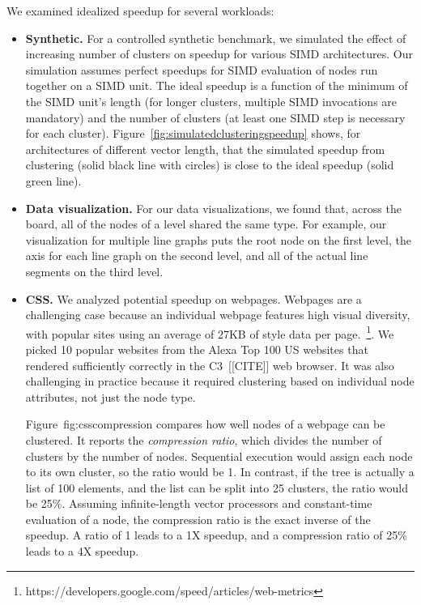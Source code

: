 We examined idealized speedup for several workloads:

\begin{itemize}

\item \textbf{Synthetic.} For a controlled synthetic benchmark, we simulated the effect of increasing number of clusters on speedup for various SIMD architectures.  Our simulation assumes perfect speedups for SIMD evaluation of nodes run together on a SIMD unit. The ideal speedup is a function of the minimum of the SIMD unit's length (for longer clusters, multiple SIMD invocations are mandatory) and the number of clusters (at least one SIMD step is necessary for each cluster).   Figure~\ref{fig:simulatedclusteringspeedup} shows, for architectures of different vector length, that the simulated speedup from clustering (solid black line with circles) is close to the ideal speedup (solid green line).

\item \textbf{Data visualization.} For our data visualizations, we found that, across the board, all of the nodes of a level shared the same type. For example, our visualization for multiple line graphs puts the root node on the first level, the axis for each line graph on the second level, and all of the actual line segments on the third level. 

\item \textbf{CSS.} We analyzed potential speedup on webpages. Webpages are a challenging case because an individual webpage features high visual diversity, with popular sites using an average of 27KB of style data per page.~\footnote{https://developers.google.com/speed/articles/web-metrics}. We picked 10 popular websites from the Alexa Top 100 US websites that rendered sufficiently correctly in the C3~[[CITE]] web browser. It was also challenging in practice because it required clustering based on individual node attributes, not just the node type.

Figure~{fig:csscompression} compares how well nodes of a webpage can be clustered. It reports the \emph{compression ratio}, which divides the number of clusters by the number of nodes. Sequential execution would assign each node to its own cluster, so the ratio would be 1. In contrast, if the tree is actually a list of 100 elements, and the list can be split into 25 clusters, the ratio would be 25\%. Assuming infinite-length vector processors and constant-time evaluation of a node, the compression ratio is the exact inverse of the speedup. A ratio of 1 leads to a 1X speedup, and a compression ratio of 25\% leads to a 4X speedup.


\end{itemize}
